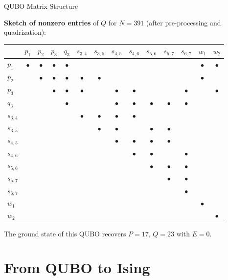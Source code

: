 \documentclass[9pt]{beamer}
\begin{document}
\begin{frame}{QUBO Matrix Structure}
\small

\textbf{Sketch of nonzero entries} of $Q$ for $N=391$ (after pre-processing and quadrization):

\begin{center}
\scriptsize
\begin{tabular}{l|cccc|ccccccc|cc}
\toprule
        & $p_1$ & $p_2$ & $p_3$ & $q_3$ & $s_{3,4}$ & $s_{3,5}$ & $s_{4,5}$ & $s_{4,6}$ & $s_{5,6}$ & $s_{5,7}$ & $s_{6,7}$ & $w_1$ & $w_2$ \\
\midrule
$p_1$    & $\bullet$ & $\bullet$ & $\bullet$ & $\bullet$ & & & & & & & & $\bullet$ & $\bullet$ \\
$p_2$    &   & $\bullet$ & $\bullet$ & $\bullet$ & $\bullet$ & $\bullet$ & & & & & & $\bullet$ &   \\
$p_3$    &   &   & $\bullet$ & $\bullet$ & $\bullet$ & & $\bullet$ & $\bullet$ & & & $\bullet$ &   & $\bullet$ \\
$q_3$    &   &   &   & $\bullet$ & & & $\bullet$ & $\bullet$ & $\bullet$ & $\bullet$ & $\bullet$ & & \\
\midrule
$s_{3,4}$ & & & & & $\bullet$ & $\bullet$ & $\bullet$ & $\bullet$ & & & & & \\
$s_{3,5}$ & & & & & & $\bullet$ & $\bullet$ & & $\bullet$ & $\bullet$ & & & \\
$s_{4,5}$ & & & & & & & $\bullet$ & $\bullet$ & $\bullet$ & $\bullet$ & & & \\
$s_{4,6}$ & & & & & & & & $\bullet$ & $\bullet$ & & $\bullet$ & & \\
$s_{5,6}$ & & & & & & & & & $\bullet$ & $\bullet$ & $\bullet$ & & \\
$s_{5,7}$ & & & & & & & & & & $\bullet$ & $\bullet$ & & \\
$s_{6,7}$ & & & & & & & & & & & $\bullet$ & & \\
\midrule
$w_1$    & & & & & & & & & & & & $\bullet$ & \\
$w_2$    & & & & & & & & & & & & & $\bullet$ \\
\bottomrule
\end{tabular}
\end{center}

The ground state of this QUBO recovers $P{=}17,\,Q{=}23$ with $E{=}0$.

\end{frame}

\section{From QUBO to Ising}
\end{document}

